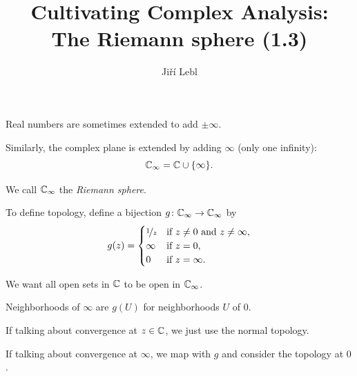 \documentclass[10pt,aspectratio=169]{beamer}
\author{Ji\v{r}\'i Lebl}
\institute[OSU]{%
Departemento pri Matematiko de Oklahoma {\^S}tata Universitato}
\title{Cultivating Complex Analysis:\\%
The Riemann sphere (1.3)}
\date{}
\begin{document}
\begin{frame}
\titlepage
\end{frame}

\begin{frame}
Real numbers are sometimes extended to add $\pm \infty$.

\medskip
\pause

Similarly, the complex plane is extended by adding $\infty$ (only one
infinity):
\[
{\mathbb{C}}_{\infty} = {\mathbb{C}} \cup \{ \infty \} .
\]

\pause
We call ${\mathbb{C}}_{\infty}$ the \emph{Riemann sphere}.

\medskip
\pause

To define topology, define a bijection $g \colon {\mathbb{C}}_\infty \to {\mathbb{C}}_\infty$ by
\[
g(z) =
\begin{cases}
\nicefrac{1}{z} & \text{if } z \not= 0 \text{ and } z \not= \infty, \\
\infty & \text{if } z = 0, \\
0 & \text{if } z = \infty.
\end{cases}
\]

\pause

We want all open sets in ${\mathbb{C}}$ to be open in ${\mathbb{C}}_\infty$.

\medskip
\pause

Neighborhoods of $\infty$ are $g(U)$ for neighborhoods $U$ of $0$.

\medskip
\pause

If talking about convergence at $z \in {\mathbb{C}}$, we just use the normal
topology.

\medskip
\pause

If talking about convergence at $\infty$, we map with $g$
and consider the topology at $0$.
\end{frame}
\end{document}
